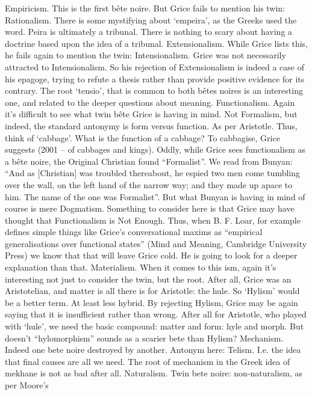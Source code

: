 \documentclass[10pt,titlepage]{book}
\begin{document}
Empiricism.  This is the first bête noire. But Grice fails to mention his 
twin: Rationalism.  There is some mystifying about ‘empeira’, as the Greeks 
used the word. Peira is  ultimately a tribunal. There is nothing to scary 
about having a doctrine based  upon the idea of a tribunal.  
Extensionalism.  While Grice lists this, he fails again to mention the 
twin: Intensionalism.  Grice was not necessarily attracted to Intensionalism. So 
his rejection of  Extensionalism is indeed a case of his epagoge, trying to 
refute a thesis rather  than provide positive evidence for its contrary. 
The root ‘tensio’, that is  common to both bêtes noires is an interesting 
one, and related to the deeper  questions about meaning. 
Functionalism.  Again it’s difficult to see what twin bête Grice is having 
in mind. Not  Formalism, but indeed, the standard antonymy is form versus 
function. As per  Aristotle. Thus, think of ‘cabbage’. What is the function 
of a cabbage? To  cabbagise, Grice suggests (2001 – of cabbages and kings). 
Oddly, while Grice  sees functionalism as a bête noire, the Original 
Christian found “Formalist”. We  read from Bunyan: “And as [Christian] was troubled 
thereabout, he espied  two men come tumbling over the wall, on the left 
hand of the narrow way; and  they made up apace to him. The name of the one was 
Formalist”. But what Bunyan  is having in mind of course is mere Dogmatism. 
Something to consider here is  that Grice may have thought that 
Functionalism is Not Enough. Thus, when B. F.  Loar, for example defines simple things 
like Grice’s conversational maxims as  “empirical generalisations over 
functional states” (Mind and Meaning, Cambridge  University Press) we know that 
that will leave Grice cold. He is going to look  for a deeper explanation 
than that. 
Materialism. When  it comes to this ism, again it’s interesting not just to 
consider the twin, but  the root. After all, Grice was an Aristotelian, and 
matter is all there is for  Aristotle: the hule. So ‘Hylism’ would be a 
better term. At least less hybrid.  By rejecting Hylism, Grice may be again 
saying that it is insufficient rather  than wrong. After all for Aristotle, 
who played with ‘hule’, we need the basic  compound: matter and form: hyle 
and morph. But doesn’t “hylomorphism” sounds as  a scarier bete than Hylism? 
Mechanism. Indeed  one bete noire destroyed by another. Antonym here: 
Telism. I.e. the idea that  final causes are all we need.  The  root of mechanism 
in the Greek idea of mekhane is not as bad after all.   
Naturalism. Twin  bete noire: non-naturalism, as per Moore’s 
\end{document}
